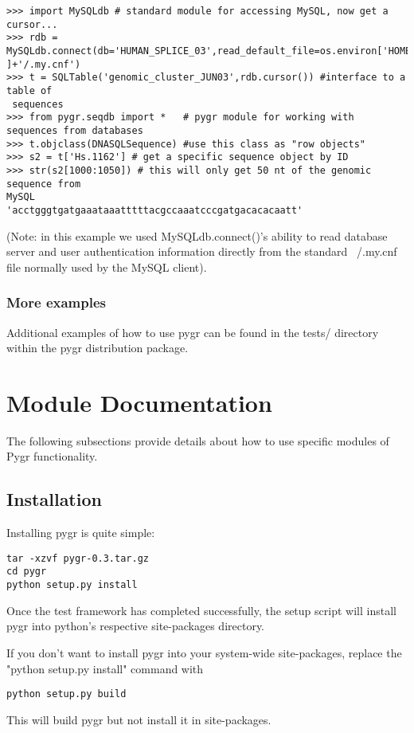 \documentclass{howto}
\begin{document}
\begin{verbatim}
>>> import MySQLdb # standard module for accessing MySQL, now get a cursor...
>>> rdb = MySQLdb.connect(db='HUMAN_SPLICE_03',read_default_file=os.environ['HOME'
]+'/.my.cnf')
>>> t = SQLTable('genomic_cluster_JUN03',rdb.cursor()) #interface to a table of
 sequences
>>> from pygr.seqdb import *   # pygr module for working with sequences from databases
>>> t.objclass(DNASQLSequence) #use this class as "row objects"
>>> s2 = t['Hs.1162'] # get a specific sequence object by ID
>>> str(s2[1000:1050]) # this will only get 50 nt of the genomic sequence from 
MySQL
'acctgggtgatgaaataaatttttacgccaaatcccgatgacacacaatt'
\end{verbatim}

(Note: in this example we used MySQLdb.connect()'s ability to read database 
server and user authentication information directly from the standard ~/.my.cnf file normally used by the MySQL client).

\subsubsection{More examples}
\label{more-exam}

Additional examples of how to use pygr can be found in the tests/ directory within the pygr distribution package.




\section{Module Documentation}
\label{module-doc}

The following subsections provide details about how to use specific
modules of Pygr functionality. 

\subsection{Installation}
\label{install}
Installing pygr is quite simple:
\begin{verbatim}
tar -xzvf pygr-0.3.tar.gz 
cd pygr
python setup.py install 
\end{verbatim}

Once the test framework has completed successfully, the setup script
will install pygr into python's respective site-packages directory. 

If you don't want to install pygr into your system-wide site-packages,
replace the "python setup.py install" command with
\begin{verbatim}
python setup.py build
\end{verbatim}
This will build pygr but not install it in site-packages.
\end{document}
